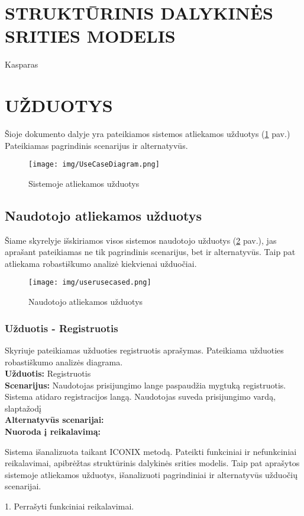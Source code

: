 \documentclass{VUMIFPSkursinis}
\begin{document}
\newpage
\section{STRUKTŪRINIS DALYKINĖS SRITIES MODELIS}
Kasparas
\newpage
\section{UŽDUOTYS}
Šioje dokumento dalyje yra pateikiamos sistemos atliekamos užduotys  (\ref{fig:usecase} pav.) Pateikiamas pagrindinis scenarijus ir alternatyvūs.\\
\begin{figure}[H]
\centering
\texttt{[image: img/UseCaseDiagram.png]}
\label{fig:usecase}
\caption{Sistemoje atliekamos užduotys}
\end{figure}

\subsection{Naudotojo atliekamos užduotys}
Šiame skyrelyje išskiriamos visos sistemos naudotojo užduotys (\ref{fig:usercd} pav.), jas aprašant pateikiamas ne tik pagrindinis scenarijus, bet ir alternatyvūs. Taip pat atliekama robastiškumo analizė kiekvienai užduočiai.

\begin{figure}[H]
\centering
\texttt{[image: img/userusecased.png]}
\label{fig:usercd}
\caption{Naudotojo atliekamos užduotys}
\end{figure}

\subsubsection{Užduotis - Registruotis}
Skyriuje pateikiamas užduoties registruotis aprašymas. Pateikiama užduoties robastiškumo analizės diagrama.\\
\textbf{Užduotis:}  Registruotis \\
\textbf{Scenarijus:} Naudotojas prisijungimo lange paspaudžia mygtuką registruotis. Sistema atidaro registracijos langą. Naudotojas suveda prisijungimo vardą, slaptažodį  \\
\textbf{Alternatyvūs scenarijai:} \\
\textbf{Nuoroda į reikalavimą: } 


\newpage

Sistema išanalizuota taikant ICONIX metodą. Pateikti funkciniai ir nefunkciniai reikalavimai, apibrėžtas struktūrinis dalykinės srities modelis. Taip pat aprašytos sistemoje atliekamos užduotys, išanalizuoti pagrindiniai ir alternatyvūs užduočių scenarijai.
\newpage

1. Perrašyti funkciniai reikalavimai.
\end{document}
